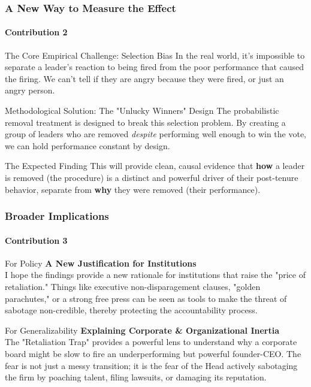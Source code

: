 \documentclass[10pt]{beamer}
\begin{document}
\begin{frame}
  \frametitle{A New Way to Measure the Effect}
  \framesubtitle{Contribution 2}
  
  \begin{block}{The Core Empirical Challenge: Selection Bias}
    In the real world, it's impossible to separate a leader's reaction to being fired from the poor performance that caused the firing. We can't tell if they are angry because they were fired, or just an angry person.
  \end{block}
  
  \begin{block}{Methodological Solution: The "Unlucky Winners" Design}
    The probabilistic removal treatment is designed to break this selection problem. By creating a group of leaders who are removed \textit{despite} performing well enough to win the vote, we can hold performance constant by design.
  \end{block}
  
  \begin{block}{The Expected Finding}
    This will provide clean, causal evidence that \textbf{how} a leader is removed (the procedure) is a distinct and powerful driver of their post-tenure behavior, separate from \textbf{why} they were removed (their performance).
  \end{block}

\end{frame}

\begin{frame}
  \frametitle{Broader Implications}
  \framesubtitle{Contribution 3}
  
  \begin{block}{For Policy}
    \textbf{A New Justification for Institutions} \\
    I hope the findings provide a new rationale for institutions that raise the "price of retaliation." Things like executive non-disparagement clauses, "golden parachutes," or a strong free press can be seen as tools to make the threat of sabotage non-credible, thereby protecting the accountability process.
  \end{block}

  \bigskip
  
  \begin{block}{For Generalizability}
    \textbf{Explaining Corporate \& Organizational Inertia} \\
    The "Retaliation Trap" provides a powerful lens to understand why a corporate board might be slow to fire an underperforming but powerful founder-CEO. The fear is not just a messy transition; it is the fear of the Head actively sabotaging the firm by poaching talent, filing lawsuits, or damaging its reputation.
  \end{block}
\end{frame}
\end{document}
